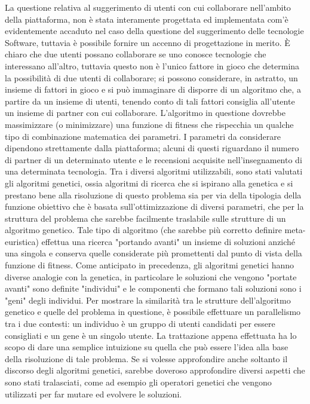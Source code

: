 La questione relativa al suggerimento di utenti con cui collaborare nell'ambito della piattaforma, non è stata interamente progettata ed implementata com'è evidentemente accaduto nel caso della questione del suggerimento delle tecnologie Software, tuttavia è possibile fornire un accenno di progettazione in merito. È chiaro che due utenti possano collaborare se uno conosce tecnologie che interessano all'altro, tuttavia questo non è l'unico fattore in gioco che determina la possibilità di due utenti di collaborare; si possono considerare, in astratto, un insieme di fattori in gioco e si può immaginare di disporre di un algoritmo che, a partire da un insieme di utenti, tenendo conto di tali fattori consiglia all'utente un insieme di partner con cui collaborare. L'algoritmo in questione dovrebbe massimizzare (o minimizzare) una funzione di fitness che rispecchia un qualche tipo di combinazione matematica dei parametri. I parametri da considerare dipendono strettamente dalla piattaforma; alcuni di questi riguardano il numero di partner di un determinato utente e le recensioni acquisite nell'insegnamento di una determinata tecnologia. Tra i diversi algoritmi utilizzabili, sono stati valutati gli algoritmi genetici, ossia algoritmi di ricerca che si ispirano alla genetica e si prestano bene alla risoluzione di questo problema sia per via della tipologia della funzione obiettivo che è basata sull'ottimizzazione di diversi parametri, che per la struttura del problema che sarebbe facilmente traslabile sulle strutture di un algoritmo genetico. Tale tipo di algoritmo (che sarebbe più corretto definire meta-euristica) effettua una ricerca "portando avanti" un insieme di soluzioni anziché una singola e conserva quelle considerate più promettenti dal punto di vista della funzione di fitness. Come anticipato in precedenza, gli algoritmi genetici hanno diverse analogie con la genetica, in particolare le soluzioni che vengono "portate avanti" sono definite "individui" e le componenti che formano tali soluzioni sono i "geni" degli individui. Per mostrare la similarità tra le strutture dell'algoritmo genetico e quelle del problema in questione, è possibile effettuare un parallelismo tra i due contesti: un individuo è un gruppo di utenti candidati per essere consigliati e un gene è un singolo utente. La trattazione appena effettuata ha lo scopo di dare una semplice intuizione su quella che può essere l'idea alla base della risoluzione di tale problema. Se si volesse approfondire anche soltanto il discorso degli algoritmi genetici, sarebbe doveroso approfondire diversi aspetti che sono stati tralasciati, come ad esempio gli operatori genetici che vengono utilizzati per far mutare ed evolvere le soluzioni. 
\newpage
